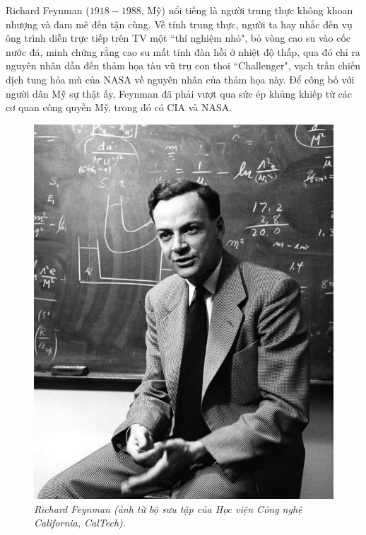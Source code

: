 \begin{multicols}{2}
	Richard Feynman ($1918-1988$, Mỹ) nổi tiếng là người trung thực không khoan nhượng và đam mê đến tận cùng. Về tính trung thực, người ta hay nhắc đến vụ ông trình diễn trực tiếp trên TV một ``thí nghiệm nhỏ", bỏ vòng cao su vào cốc nước đá, minh chứng rằng cao su mất tính đàn hồi ở nhiệt độ thấp, qua đó chỉ ra nguyên nhân dẫn đến thảm họa tàu vũ trụ con thoi ``Challenger", vạch trần chiến dịch tung hỏa mù của NASA về nguyên nhân của thảm họa này. Để công bố với người dân Mỹ sự thật ấy, Feynman đã phải vượt qua sức ép khủng khiếp từ các cơ quan công quyền Mỹ, trong đó có CIA và NASA. 
	\begin{figure}[H]
		\vspace*{-5pt}
		\centering
		\captionsetup{labelformat= empty, justification=centering}
		\includegraphics[width= 1\linewidth]{1a}
		\caption{\small\textit{\color{quantoan}Richard Feynman (ảnh từ bộ sưu tập của Học viện Công nghệ California, CalTech).}}
		\vspace*{-10pt}
	\end{figure}

\end{multicols}
